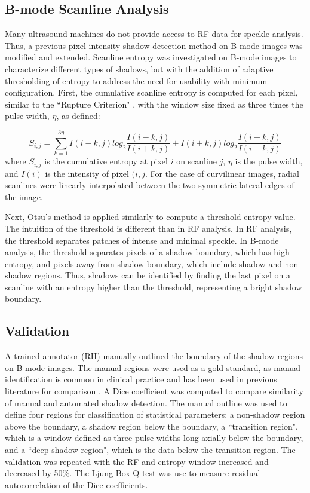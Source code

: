\documentclass[authoryear,preprint,review,12pt]{elsarticle}
\begin{document}
\subsection*{B-mode Scanline Analysis}

Many ultrasound machines do not provide access to RF data for speckle analysis. Thus, a previous pixel-intensity shadow detection method on B-mode images was modified and extended. Scanline entropy was investigated on B-mode images to characterize different types of shadows, but with the addition of adaptive thresholding of entropy to address the need for usability with minimum configuration. First, the cumulative scanline entropy is computed for each pixel, similar to the ``Rupture Criterion" \citep{Hellier2010}, with the window size fixed as three times the pulse width, $\eta$, as defined:

\begin{equation}
S_{i,j} = \sum_{k=1}^{3\eta}I(i-k,j)log_{2}\frac{I(i-k,j)}{I(i+k,j)}+I(i+k,j)log_{2}\frac{I(i+k,j)}{I(i-k,j)}
\end{equation} where $S_{i,j}$ is the cumulative entropy at pixel $i$ on scanline $j$, $\eta$ is the pulse width, and $I(i)$ is the intensity of pixel $(i,j$. For the case of curvilinear images, radial scanlines were linearly interpolated between the two symmetric lateral edges of the image.

Next, Otsu's method is applied similarly to compute a threshold entropy value. The intuition of the threshold is different than in RF analysis. In RF analysis, the threshold separates patches of intense and minimal speckle. In B-mode analysis, the threshold separates pixels of a shadow boundary, which has high entropy, and pixels away from shadow boundary, which include shadow and non-shadow regions. Thus, shadows can be identified by finding the last pixel on a scanline with an entropy higher than the threshold, representing a bright shadow boundary.


\subsection*{Validation}

A trained annotator (RH) manually outlined the boundary of the shadow regions on B-mode images. The manual regions were used as a gold standard, as manual identification is common in clinical practice and has been used in previous literature for comparison \citep{Hellier2010}. A Dice coefficient was computed to compare similarity of manual and automated shadow detection. The manual outline was used to define four regions for classification of statistical parameters: a non-shadow region above the boundary, a shadow region below the boundary, a ``transition region", which is a window defined as three pulse widths long axially below the boundary, and a ``deep shadow region", which is the data below the transition region. The validation was repeated with the RF and entropy window increased and decreased by 50\%. The Ljung-Box Q-test was use to measure residual autocorrelation of the Dice coefficients.
%
\end{document}
